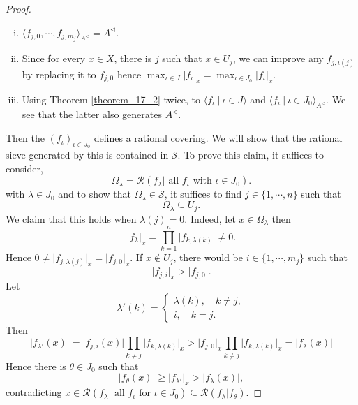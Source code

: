 \documentclass[10pt]{article}
\numberwithin{equation}{section}
\theoremstyle{definition}
\newcommand{\cR}[0]{\mathcal{R}}
\newcommand{\sep}[0]{\:|\:}
\newcommand{\ab}[1]{\vert #1 \vert}
\newcommand{\sS}[0]{\mathscr{S}}
\begin{document}
\begin{proof}
\begin{enumerate}[i.]
        \item $\langle f_{j,0},\cdots,f_{j,m_j}\rangle_{A^\triangleleft}=A^\triangleleft$.
        \item Since for every $x\in X$, there is $j$ such that $x\in U_j$, we can improve any $f_{j,\iota(j)}$ by replacing it to $f_{j,0}$ hence $\max_{\iota\in J}\ab{f_\iota}_x = \max_{\iota\in J_0}\ab{f_\iota}_x$.
        \item Using Theorem \ref{theorem_17_2} twice, to $\langle f_\iota\sep \iota\in J\rangle$ and $\langle f_\iota\sep \iota\in J_0\rangle_{A^\triangleleft}$. We see that the latter also generates $A^\triangleleft$.
    \end{enumerate}
    Then the $(f_\iota)_{\iota\in J_0}$ defines a rational covering. We will show that the rational sieve generated by this is contained in $\sS$. To prove this claim, it suffices to consider,
    \begin{equation*}
        \Omega_\lambda = \cR(f_\lambda|\text{ all $f_\iota$ with $\iota\in J_0$}).
    \end{equation*}
    with $\lambda\in J_0$ and to show that $\Omega_\lambda\in\sS$, it suffices to find $j\in\{1,\cdots,n\}$ such that
    \begin{equation*}
        \Omega_\lambda\subseteq U_j.
    \end{equation*}
    We claim that this holds when $\lambda(j) = 0$.
    Indeed, let $x\in\Omega_\lambda$ then
    \begin{equation*}
        \ab{f_\lambda}_x = \prod_{k=1}^n\ab{f_{k,\lambda(k)}}\not=0.
    \end{equation*}
    Hence $0\not=\ab{f_{j,\lambda(j)}}_x = \ab{f_{j,0}}_x$.
    If $x\not\in U_j$, there would be $i\in \{1,\cdots,m_j\}$ such that
    \begin{equation*}
        \ab{f_{j,i}}_x>\ab{f_{j,0}}.
    \end{equation*}
    Let
    \begin{equation*}
        \lambda'(k) = \begin{cases}
            \lambda(k),\quad k\not=j,\\
            i,\quad k=j.
        \end{cases}
    \end{equation*}
    Then
    \begin{equation*}
        \ab{f_{\lambda'}(x)} = \ab{f_{j,i}(x)}\prod_{k\not=j}\ab{f_{k,\lambda(k)}}_x>\ab{f_{j,0}}_x\prod_{k\not=j}\ab{f_{k,\lambda(k)}}_x = \ab{f_\lambda(x)}
    \end{equation*}
    Hence there is $\theta\in J_0$ such that
    \begin{equation*}
    \ab{f_\theta(x)}\geq \ab{f_{\lambda'}}_x>\ab{f_\lambda(x)},
    \end{equation*}
    contradicting $x\in\cR(f_\lambda|\text{ all $f_\iota$ for $\iota\in J_0$})\subseteq\cR(f_\lambda|f_\theta)$.
\end{proof}
\end{document}
